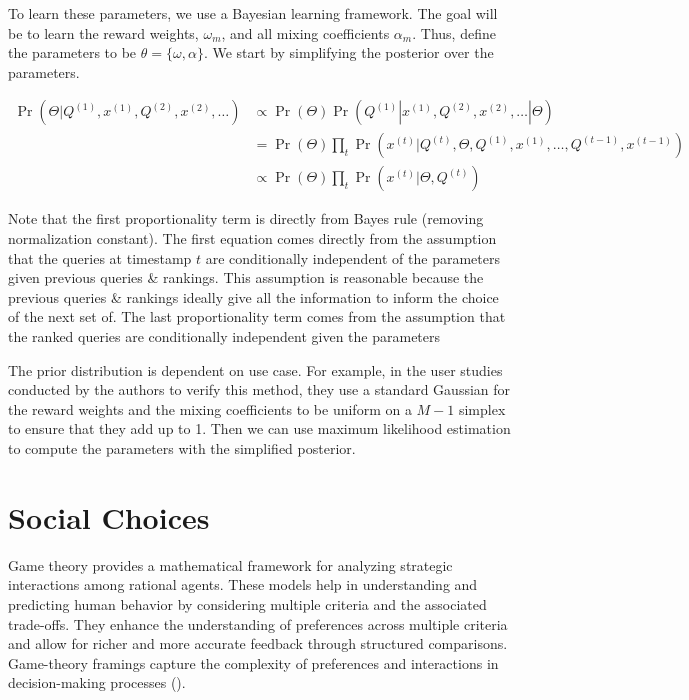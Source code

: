 \documentclass[
  letterpaper,
  numbers=noenddot,
  DIV=11]{scrreprt}
\theoremstyle{definition}
\theoremstyle{plain}
\theoremstyle{plain}
\theoremstyle{remark}
\begin{document}
To learn these parameters, we use a Bayesian learning framework. The
goal will be to learn the reward weights, \(\omega_m\), and all mixing
coefficients \(\alpha_m\). Thus, define the parameters to be
\(\theta = \{\omega, \alpha\}\). We start by simplifying the posterior
over the parameters.

\[\begin{aligned}
\Pr(\Theta | Q^{(1)}, x^{(1)}, Q^{(2)}, x^{(2)}, \ldots) & \propto \Pr(\Theta) \Pr(Q^{(1)} | x^{(1)}, Q^{(2)}, x^{(2)}, \ldots | \Theta) \\
& = \Pr(\Theta) \prod_t \Pr(x^{(t)} | Q^{(t)}, \Theta, Q^{(1)}, x^{(1)}, \ldots, Q^{(t-1)}, x^{(t-1)}) \\
& \propto \Pr(\Theta) \prod_t \Pr(x^{(t)} | \Theta, Q^{(t)})
\end{aligned}\]

Note that the first proportionality term is directly from Bayes rule
(removing normalization constant). The first equation comes directly
from the assumption that the queries at timestamp \(t\) are
conditionally independent of the parameters given previous queries \&
rankings. This assumption is reasonable because the previous queries \&
rankings ideally give all the information to inform the choice of the
next set of. The last proportionality term comes from the assumption
that the ranked queries are conditionally independent given the
parameters

The prior distribution is dependent on use case. For example, in the
user studies conducted by the authors to verify this method, they use a
standard Gaussian for the reward weights and the mixing coefficients to
be uniform on a \(M - 1\) simplex to ensure that they add up to 1. Then
we can use maximum likelihood estimation to compute the parameters with
the simplified posterior.

\section{Social Choices}\label{social-choices}

Game theory provides a mathematical framework for analyzing strategic
interactions among rational agents. These models help in understanding
and predicting human behavior by considering multiple criteria and the
associated trade-offs. They enhance the understanding of preferences
across multiple criteria and allow for richer and more accurate feedback
through structured comparisons. Game-theory framings capture the
complexity of preferences and interactions in decision-making processes
().
\end{document}
